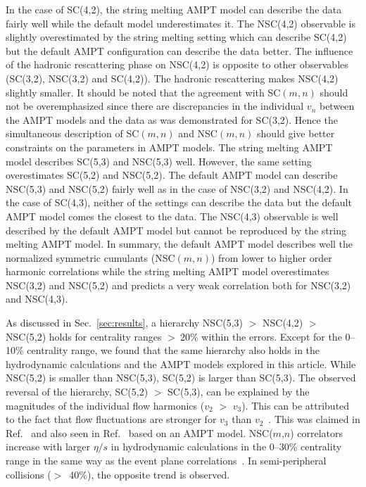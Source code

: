 In the case of SC(4,2), the string melting AMPT model can describe the data fairly well while the default model underestimates it.
The NSC(4,2) observable is slightly overestimated by the string melting setting which can describe SC(4,2) but the default AMPT configuration can describe the data better.
The influence of the hadronic rescattering phase on NSC(4,2) is opposite to other observables (SC(3,2), NSC(3,2) and SC(4,2)). The hadronic rescattering makes NSC(4,2) slightly smaller.
It should be noted that the agreement with SC$(m,n)$ should not be overemphasized since there are discrepancies in the individual $v_n$ between the AMPT models and the data as was demonstrated for SC(3,2).
Hence the simultaneous description of SC$(m,n)$ and NSC$(m,n)$ should give better constraints on the parameters in AMPT models.
The string melting AMPT model describes SC(5,3) and NSC(5,3) well. However, the same setting overestimates SC(5,2) and NSC(5,2). 
The default AMPT model can describe NSC(5,3) and NSC(5,2) fairly well as in the case of NSC(3,2) and NSC(4,2).
In the case of SC(4,3), neither of the settings can describe the data but the default AMPT model comes the closest to the data. 
The NSC(4,3) observable is well described by the default AMPT model but cannot be reproduced by the string melting AMPT model.
In summary, the default AMPT model describes well the normalized symmetric cumulants (NSC$(m,n)$) from lower to higher order harmonic correlations while the string melting AMPT model overestimates NSC(3,2) and NSC(5,2) and predicts a very weak correlation both for NSC(3,2) and NSC(4,3). 

As discussed in Sec.~\ref{sec:results}, a hierarchy NSC(5,3) $>$ NSC(4,2) $>$ NSC(5,2) holds for centrality ranges $>~20\%$ within the errors.
Except for the 0--10\% centrality range, we found that the same hierarchy also holds in the hydrodynamic calculations and the AMPT models explored in this article.
While NSC(5,2) is smaller than NSC(5,3), SC(5,2) is larger than SC(5,3).
The observed reversal of the hierarchy, SC(5,2) $>$ SC(5,3), can be explained by the magnitudes of the individual flow harmonics ($v_2$ $>$ $v_3$). 
This can be attributed to the fact that flow fluctuations are stronger for $v_3$ than $v_2$~\cite{Aad:2013xma}. This was claimed in Ref.~\cite{Zhu:2016puf} and also seen in Ref.~\cite{Bhalerao:2014xra} based on an AMPT model. 
NSC($m$,$n$) correlators increase with larger $\eta/s$ in hydrodynamic calculations in the 0--30\% centrality range in the same way as the event plane correlations~\cite{Bhalerao:2013ina,Teaney:2013dta}. In semi-peripheral collisions ($>$~40\%), the opposite trend is observed.

